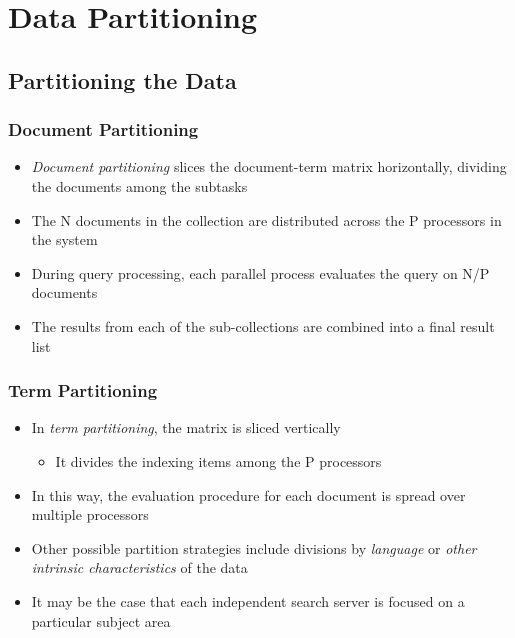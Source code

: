 \documentclass{beamer}
\begin{document}
\section{Data Partitioning}

\subsection{Partitioning the Data}

\begin{frame}
    \frametitle{Document Partitioning}
    
    \begin{itemize}
    \item \emph{Document partitioning} slices the document-term matrix
        horizontally, dividing the documents among the subtasks
    \item The N documents in the collection are distributed across the P
        processors in the system
    \item During query processing, each parallel process evaluates the query on
        N/P documents
    \item The results from each of the sub-collections are combined into a
        final result list
    \end{itemize}
\end{frame}

\begin{frame}
    \frametitle{Term Partitioning}

    \begin{itemize}
    \item In \emph{term partitioning}, the matrix is sliced vertically
        \begin{itemize}
        \item It divides the indexing items among the P processors
        \end{itemize}
    \item In this way, the evaluation procedure for each document is spread
        over multiple processors
    \item Other possible partition strategies include divisions by
        \emph{language} or \emph{other intrinsic characteristics} of the data
    \item It may be the case that each independent search server is focused on
        a particular subject area
    \end{itemize}
\end{frame}
\end{document}
